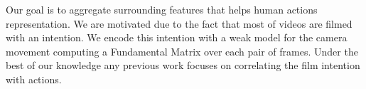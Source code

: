 Our goal is to aggregate surrounding features that helps human actions representation. We are motivated due to the fact that most of videos are filmed with an intention. We encode this intention with a weak model for the camera movement computing a Fundamental Matrix over each pair of frames. Under the best of our knowledge any previous work focuses on correlating the film intention with actions. 


 





%
